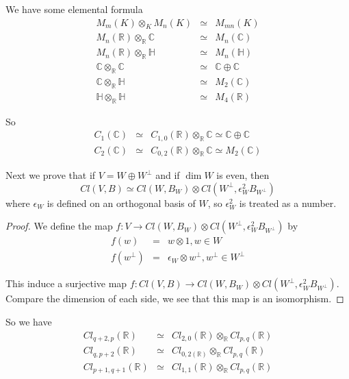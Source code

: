 \documentclass[12pt]{book}
\begin{document}
	We have some elemental formula
	\begin{eqnarray}
		M_m(K)\otimes_K M_n(K)&\simeq&M_{mn}(K)\\
		M_n(\mathbb R)\otimes_{\mathbb R}\mathbb C&\simeq&M_n(\mathbb C)\\
		M_n(\mathbb R)\otimes_{\mathbb R}\mathbb H&\simeq&M_n(\mathbb H)\\
		\mathbb C \otimes_{\mathbb R}\mathbb C&\simeq&\mathbb C \oplus \mathbb C\\
		\mathbb C \otimes_{\mathbb R}\mathbb H&\simeq&M_2( \mathbb C)\\
		\mathbb H \otimes_{\mathbb R}\mathbb H&\simeq&M_4( \mathbb R)
	\end{eqnarray}
	
	So
	\begin{eqnarray}
		C_1(\mathbb C)&\simeq& C_{1,0}(\mathbb R)\otimes_{\mathbb R}\mathbb C\simeq \mathbb C \oplus \mathbb C\\
		C_2(\mathbb C)&\simeq& C_{0,2}(\mathbb R)\otimes_{\mathbb R}\mathbb C\simeq M_2( \mathbb C)
	\end{eqnarray}
	
	Next we prove that if $V=W\oplus W^\perp$ and if $\dim W$ is even, then
	\begin{equation}
		Cl(V,B)\simeq Cl(W,B_W)\otimes Cl(W^\perp,\epsilon_W^2 B_{W^\perp})
	\end{equation} 
	where $\epsilon_W$ is defined on an orthogonal basis of $W$, so $\epsilon_W^2$ is treated as a number.
	\begin{proof}
		We define the map $f:V\rightarrow Cl(W,B_W)\otimes Cl(W^\perp,\epsilon_W^2 B_{W^\perp})$ by
		\begin{eqnarray}
			f(w)&=&w\otimes 1, w\in W\\
			f(w^\perp)&=&\epsilon_W \otimes w^\perp, w^\perp\in W^\perp
		\end{eqnarray}
	
		This induce a surjective map $f:Cl(V,B)\rightarrow Cl(W,B_W)\otimes Cl(W^\perp,\epsilon_W^2 B_{W^\perp})$. Compare the dimension of each side, we see that this map is an isomorphism.
	\end{proof}
	So we have
	\begin{eqnarray}
		Cl_{q+2,p}(\mathbb R)&\simeq&Cl_{2,0}(\mathbb R)\otimes_{\mathbb R} Cl_{p,q}(\mathbb R)\\
		Cl_{q,p+2}(\mathbb R)&\simeq&Cl_{0,2(\mathbb R)}\otimes_{\mathbb R} Cl_{p,q}(\mathbb R)\\
		Cl_{p+1,q+1}(\mathbb R)&\simeq&Cl_{1,1}(\mathbb R)\otimes_{\mathbb R} Cl_{p,q}(\mathbb R)
	\end{eqnarray}
	
\end{document}
